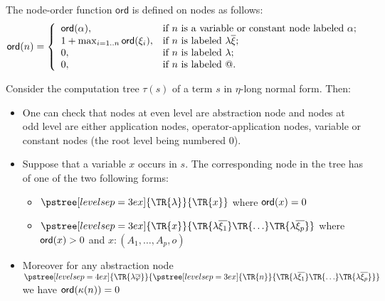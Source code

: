 \begin{dfn}

 The node-order function $\textsf{ord}$
is defined on nodes as follows:
\begin{eqnarray*}
{\sf ord}(n) = \left\{
  \begin{array}{ll}
    {\sf ord}(\alpha), & \hbox{if $n$ is a variable or constant node labeled $\alpha $;} \\
    1 + \max_{i=1..n} {\sf ord}(\xi_i), & \hbox{if $n$ is labeled $\lambda \overline{\xi}$;} \\
    0, & \hbox{if $n$ is labeled $\lambda$;} \\
    0, & \hbox{if $n$ is labeled $@$.}
  \end{array}
\right.
\end{eqnarray*}
\end{dfn}


Consider the computation tree $\tau(s)$ of a term $s$ in $\eta$-long normal form. Then:
\begin{itemize}
\item One can check that nodes at even level are abstraction
node and nodes at odd level are either application nodes,
operator-application nodes, variable or constant nodes (the root level being numbered $0$).

\item Suppose that a variable $x$ occurs in $s$. The corresponding node in the tree has of one of the two following forms:
    \begin{itemize}
    \item $ \pstree[levelsep=3ex]
        { \TR{\lambda } }
        { \TR{x}
        }$ where ${\sf ord}(x) = 0$

    \item $ \pstree[levelsep=3ex]
                { \TR{x} }
                { \TR{\lambda \overline{\xi_1}} \TR{\ldots} \TR{\lambda \overline{\xi_p}}}
        $ where ${\sf ord}(x) > 0$ and $x:(A_1,\ldots,A_p,o)$
    \end{itemize}

\item    Moreover for any abstraction node
        $ \pstree[levelsep=4ex]
            { \TR{\lambda \overline{\varphi}} }
            { \pstree[levelsep=3ex]
                {\TR{n}}
                {\TR{\lambda \overline{\xi_1}} \TR{\ldots} \TR{\lambda \overline{\xi_p}}}
            }
        $
    we have ${\sf ord}(\kappa(n))=0$

\end{itemize}



